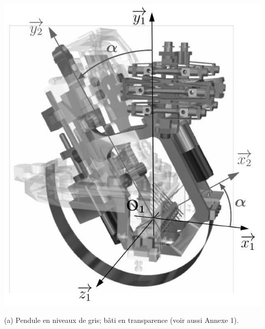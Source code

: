 \documentclass[10pt]{article}
\begin{document}
\begin{center}
\includegraphics[max width=\textwidth]{2024_04_26_3285cfc264024262add0g-04}
\end{center}

(a) Pendule en niveaux de gris; bâti en transparence (voir aussi Annexe 1).
\end{document}
